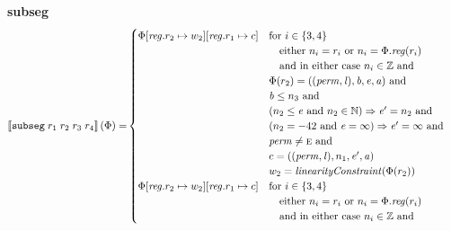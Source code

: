 \documentclass[a4paper]{article}
\newcommand{\sem}[1]{\left\llbracket #1 \right\rrbracket}
\newcommand{\tand}{\text{ and }}
\newcommand{\targetcolor}[1]{\color{black}}
\newcommand{\trg}[1]{{\targetcolor{} #1}}
\newcommand{\zinstr}[1]{\texttt{#1}}
\newcommand{\fourinstr}[5]{
  \ifthenelse{\equal{#2#3#4#5}{}}
  {\zinstr{#1}}
  {\zinstr{#1} \; #2 \; #3 \; #4 \; #5}
}
\newcommand{\tsubseg}[4]{\fourinstr{\trg{subseg}}{#1}{#2}{#3}{#4}}
\newcommand{\nats}{\mathbb{N}}
\newcommand{\ints}{\mathbb{Z}}
\newcommand{\update}[2]{[#1 \mapsto #2]}
\newcommand{\updReg}[2]{\update{\reg.#1}{#2}}
\newcommand{\perm}{\var{perm}}
\newcommand{\lin}{\var{l}}
\newcommand{\var}[1]{\mathit{#1}}
\newcommand{\reg}{\var{reg}}
\newcommand{\baddr}{\var{b}}
\newcommand{\eaddr}{\var{e}}
\newcommand{\aaddr}{\var{a}}
\newcommand{\plainperm}[1]{\textsc{#1}}
\newcommand{\enter}{\plainperm{e}}
\newcommand{\plainfun}[2]{
  \ifthenelse{\equal{#2}{}}
  {\mathit{#1}}
  {\mathit{#1}(#2)}
}
\newcommand{\linCons}[1]{\plainfun{linearityConstraint}{#1}}
\begin{document}
\noindent\textbf{subseg}\\
\begin{align*}
  \sem{\tsubseg{r_1}{r_2}{r_3}{r_4}}(\Phi) = &
                                               \begin{cases}
                                                 \Phi\updReg{r_2}{w_2}\updReg{r_1}{c} &
                                                 \arraycolsep=0pt
                                                 \begin{array}[t]{l}
                                                   \text{for $i \in \{3, 4\}$ } \\
                                                   \quad \text{either $n_i = r_i$ or $n_i = \Phi.\reg(r_i)$}\\
                                                   \quad \text{and in either case $n_i \in \ints$ and} \\
                                                   \Phi(r_2) = ((\perm,\lin),\baddr,\eaddr,\aaddr) \tand \\
                                                   \baddr \leq n_3 \tand \\
                                                   (n_2 \leq \eaddr \tand n_2 \in \nats) \Rightarrow \eaddr' = n_2 \tand \\
                                                   (n_2 = -42 \tand \eaddr = \infty) \Rightarrow \eaddr' = \infty \tand\\
                                                   \perm \neq \enter \tand\\
                                                   c = ((\perm,\lin),n_1,\eaddr',\aaddr)\\
                                                   w_2 = \linCons{\Phi(r_2)}
                                                 \end{array}
\\
                                                 \Phi\updReg{r_2}{w_2}\updReg{r_1}{c} &
                                                 \arraycolsep=0pt
                                                 \begin{array}[t]{l}
                                                   \text{for $i \in \{3, 4\}$ } \\
                                                   \quad \text{either $n_i = r_i$ or $n_i = \Phi.\reg(r_i)$}\\
                                                   \quad \text{and in either case $n_i \in \ints$ and} \\

\end{array}
\end{cases}
\end{align*}
\end{document}
